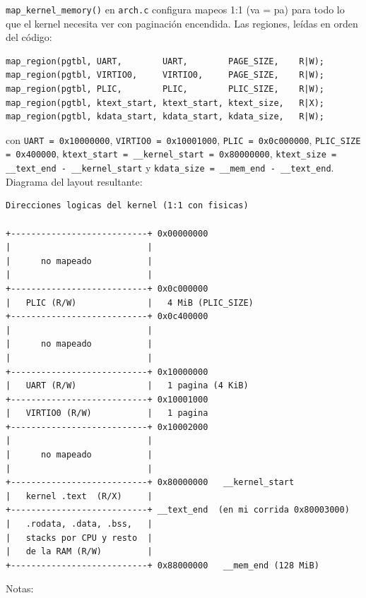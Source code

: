 \documentclass[11pt,a4paper]{article}
\begin{document}
\texttt{map\_kernel\_memory()} en \texttt{arch.c} configura mapeos 1:1 (va = pa)
para todo lo que el kernel necesita ver con paginación encendida. Las regiones,
leídas en orden del código:

\begin{lstlisting}[style=cstyle]
map_region(pgtbl, UART,        UART,        PAGE_SIZE,    R|W);
map_region(pgtbl, VIRTIO0,     VIRTIO0,     PAGE_SIZE,    R|W);
map_region(pgtbl, PLIC,        PLIC,        PLIC_SIZE,    R|W);
map_region(pgtbl, ktext_start, ktext_start, ktext_size,   R|X);
map_region(pgtbl, kdata_start, kdata_start, kdata_size,   R|W);
\end{lstlisting}

con \texttt{UART = 0x10000000}, \texttt{VIRTIO0 = 0x10001000},
\texttt{PLIC = 0x0c000000}, \texttt{PLIC\_SIZE = 0x400000},
\texttt{ktext\_start = \_\_kernel\_start = 0x80000000},
\texttt{ktext\_size = \_\_text\_end - \_\_kernel\_start} y
\texttt{kdata\_size = \_\_mem\_end - \_\_text\_end}. Diagrama del layout
resultante:

\begin{lstlisting}[style=textstyle]
Direcciones logicas del kernel (1:1 con fisicas)

+---------------------------+ 0x00000000
|                           |
|      no mapeado           |
|                           |
+---------------------------+ 0x0c000000
|   PLIC (R/W)              |   4 MiB (PLIC_SIZE)
+---------------------------+ 0x0c400000
|                           |
|      no mapeado           |
|                           |
+---------------------------+ 0x10000000
|   UART (R/W)              |   1 pagina (4 KiB)
+---------------------------+ 0x10001000
|   VIRTIO0 (R/W)           |   1 pagina
+---------------------------+ 0x10002000
|                           |
|      no mapeado           |
|                           |
+---------------------------+ 0x80000000   __kernel_start
|   kernel .text  (R/X)     |
+---------------------------+ __text_end  (en mi corrida 0x80003000)
|   .rodata, .data, .bss,   |
|   stacks por CPU y resto  |
|   de la RAM (R/W)         |
+---------------------------+ 0x88000000   __mem_end (128 MiB)
\end{lstlisting}

Notas:
\end{document}
